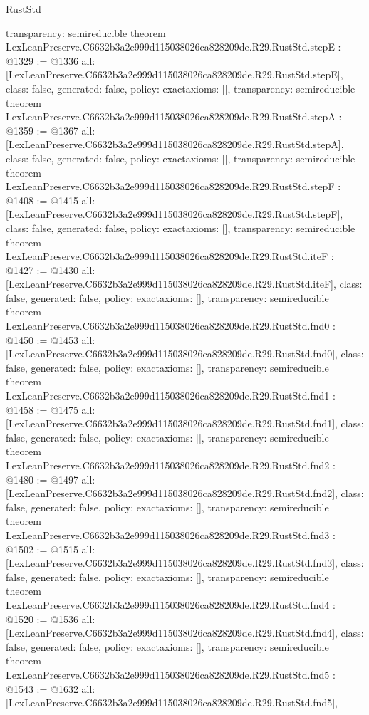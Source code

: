 \begin{lexlean}{RustStd}
\begin{coremodule}
{  transparency: semireducible
}
theorem LexLeanPreserve.C6632b3a2e999d115038026ca828209de.R29.RustStd.stepE : @1329 := @1336 {
  all: [LexLeanPreserve.C6632b3a2e999d115038026ca828209de.R29.RustStd.stepE],
  class: false,
  generated: false,
  policy: exact{axioms: []},
  transparency: semireducible
}
theorem LexLeanPreserve.C6632b3a2e999d115038026ca828209de.R29.RustStd.stepA : @1359 := @1367 {
  all: [LexLeanPreserve.C6632b3a2e999d115038026ca828209de.R29.RustStd.stepA],
  class: false,
  generated: false,
  policy: exact{axioms: []},
  transparency: semireducible
}
theorem LexLeanPreserve.C6632b3a2e999d115038026ca828209de.R29.RustStd.stepF : @1408 := @1415 {
  all: [LexLeanPreserve.C6632b3a2e999d115038026ca828209de.R29.RustStd.stepF],
  class: false,
  generated: false,
  policy: exact{axioms: []},
  transparency: semireducible
}
theorem LexLeanPreserve.C6632b3a2e999d115038026ca828209de.R29.RustStd.iteF : @1427 := @1430 {
  all: [LexLeanPreserve.C6632b3a2e999d115038026ca828209de.R29.RustStd.iteF],
  class: false,
  generated: false,
  policy: exact{axioms: []},
  transparency: semireducible
}
theorem LexLeanPreserve.C6632b3a2e999d115038026ca828209de.R29.RustStd.fnd0 : @1450 := @1453 {
  all: [LexLeanPreserve.C6632b3a2e999d115038026ca828209de.R29.RustStd.fnd0],
  class: false,
  generated: false,
  policy: exact{axioms: []},
  transparency: semireducible
}
theorem LexLeanPreserve.C6632b3a2e999d115038026ca828209de.R29.RustStd.fnd1 : @1458 := @1475 {
  all: [LexLeanPreserve.C6632b3a2e999d115038026ca828209de.R29.RustStd.fnd1],
  class: false,
  generated: false,
  policy: exact{axioms: []},
  transparency: semireducible
}
theorem LexLeanPreserve.C6632b3a2e999d115038026ca828209de.R29.RustStd.fnd2 : @1480 := @1497 {
  all: [LexLeanPreserve.C6632b3a2e999d115038026ca828209de.R29.RustStd.fnd2],
  class: false,
  generated: false,
  policy: exact{axioms: []},
  transparency: semireducible
}
theorem LexLeanPreserve.C6632b3a2e999d115038026ca828209de.R29.RustStd.fnd3 : @1502 := @1515 {
  all: [LexLeanPreserve.C6632b3a2e999d115038026ca828209de.R29.RustStd.fnd3],
  class: false,
  generated: false,
  policy: exact{axioms: []},
  transparency: semireducible
}
theorem LexLeanPreserve.C6632b3a2e999d115038026ca828209de.R29.RustStd.fnd4 : @1520 := @1536 {
  all: [LexLeanPreserve.C6632b3a2e999d115038026ca828209de.R29.RustStd.fnd4],
  class: false,
  generated: false,
  policy: exact{axioms: []},
  transparency: semireducible
}
theorem LexLeanPreserve.C6632b3a2e999d115038026ca828209de.R29.RustStd.fnd5 : @1543 := @1632 {
  all: [LexLeanPreserve.C6632b3a2e999d115038026ca828209de.R29.RustStd.fnd5],
}
\end{coremodule}
\end{lexlean}
